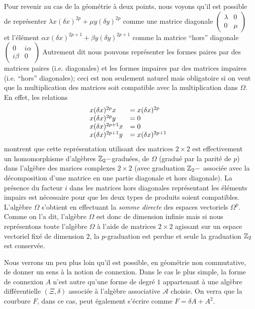 Pour revenir au cas de la g\'eom\'etrie \`a deux points, nous voyons qu'il est possible de
 repr\'esenter $\lambda x
(\delta x)^{2p} + \mu y (\delta y)^{2p}$ comme une matrice diagonale
$\begin{pmatrix} \lambda & 0 \\ 0 & \mu  \end{pmatrix} $ et l'\'el\'ement $\alpha x
(\delta x)^{2p+1} + \beta y (\delta y)^{2p+1}$ comme la matrice 
``hors'' diagonale $\begin{pmatrix} 0 & i\alpha \\ i\beta & 0  \end{pmatrix}$  
Autrement dit nous pouvons repr\'esenter les formes paires par des 
matrices paires (i.e. diagonales) et les formes impaires
par des matrices impaires (i.e. ``hors'' diagonales); 
ceci est non seulement naturel mais obligatoire
si on veut que la multiplication des matrices soit compatible
 avec la multiplication dans $\Omega$. En effet, les relations $$
\begin{array}{*2l} x (\delta x)^{2p} x &= x (\delta x)^{2p} \\ x
(\delta x)^{2p} y &= 0 \\ x (\delta x)^{2p+1} x &= 0 \\ x (\delta
x)^{2p+1} y &=x (\delta x)^{2p+1} \end{array} $$ montrent que cette
repr\'esentation utilisant des matrices $2 \times 2$ 
est effectivement un homomorphisme d'alg\`ebres  $\mathbb{Z}_2-$gradu\'ees, de $\Omega$
 (gradu\'e par la parit\'e de $p$) dans l'alg\`ebre des marices complexes $2 \times 2$
(avec graduation $\mathbb{Z}_2-$ associ\'ee avec la d\'ecomposition d'une matrice 
en une partie diagonale et hors diagonale).
La pr\'esence du facteur $i$ dans les matrices hors diagonales
repr\'esentant les \'el\'ements impairs est n\'ecessaire pour que les deux 
types de produits soient compatibles. L'alg\`ebre $\Omega$ 
s'obtient en effectuant la {\it somme directe \/} des espaces 
vectoriels $\Omega^p$. Comme on l'a dit, 
l'alg\`ebre $\Omega$ est donc de dimension infinie 
mais si nous repr\'esentons toute l'alg\`ebre
$\Omega$ \`a l'aide de matrices $2\times 2$ agissant sur un espace 
vectoriel fix\'e de dimension $2$, la $p$-graduation est perdue et seule 
la graduation $\mathbb{Z}_{2}$ est conserv\'ee.

Nous verrons un peu plus loin qu'il est possible, en g\'eom\'etrie 
non commutative, de donner un sens \`a la notion de connexion.
Dans le cas le plus simple, la forme de connexion $A$ n'est autre qu'une 
forme de degr\'e $1$ appartenant \`a une alg\`ebre diff\'erentielle 
$(\Xi, \delta)$ associ\'ee \`a l'alg\`ebre associative $\mathcal A$ choisie.
On verra que la courbure $F$, dans ce cas, peut \'egalement 
s'\'ecrire comme $F = \delta A + A^{2}$.

